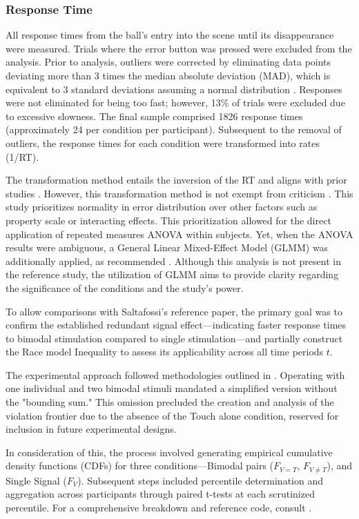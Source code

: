 \documentclass[12pt,oneside,openright]{report}
\begin{document}
\subsubsection*{Response Time}
All response times from the ball's entry into the scene until its disappearance were measured. Trials where the error button was pressed were excluded from the analysis. Prior to analysis, outliers were corrected by eliminating data points deviating more than 3 times the median absolute deviation (MAD), which is equivalent to 3 standard deviations assuming a normal distribution \parencite{Innes2019ACA}. Responses were not eliminated for being too fast; however, 13\% of trials were excluded due to excessive slowness. The final sample comprised 1826 response times (approximately 24 per condition per participant). Subsequent to the removal of outliers, the response times for each condition were transformed into rates (1/RT).

The transformation method entails the inversion of the RT and aligns with prior studies \parencite{Innes2019ACA}. However, this transformation method is not exempt from criticism \parencite{Lo2015-fv}. This study prioritizes normality in error distribution over other factors such as property scale or interacting effects. This prioritization allowed for the direct application of repeated measures ANOVA within subjects. Yet, when the ANOVA results were ambiguous, a General Linear Mixed-Effect Model (GLMM) was additionally applied, as recommended \parencite{Lo2015-fv}. Although this analysis is not present in the reference study, the utilization of GLMM aims to provide clarity regarding the significance of the conditions and the study's power.

To allow comparisons with Saltafossi's reference paper, the primary goal was to confirm the established redundant signal effect—indicating faster response times to bimodal stimulation compared to single stimulation—and partially construct the Race model Inequality to assess its applicability across all time periods $t$.

The experimental approach followed methodologies outlined in \cite{Ulrich2007,Innes2019ACA}. Operating with one individual and two bimodal stimuli mandated a simplified version without the "bounding sum." This omission precluded the creation and analysis of the violation frontier due to the absence of the Touch alone condition, reserved for inclusion in future experimental designs.

In consideration of this, the process involved generating empirical cumulative density functions (CDFs) for three conditions—Bimodal pairs ($F_{V=T}$, $F_{V \neq T}$), and Single Signal ($F_V$). Subsequent steps included percentile determination and aggregation across participants through paired t-tests at each scrutinized percentile. For a comprehensive breakdown and reference code, consult \cite{Ulrich2007}.
\end{document}
